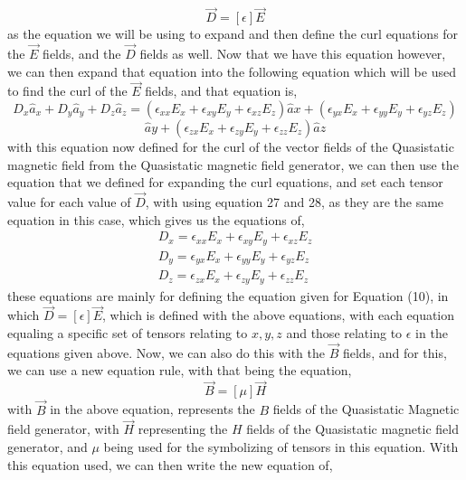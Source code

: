 \documentclass[]{article}
\begin{document}
\begin{equation}
\vec{D} = [\epsilon]\vec{E}
\end{equation}
as the equation we will be using to expand and then define the curl equations for the $\vec{E}$ fields, and the $\vec{D}$ fields as well. Now that we have this equation however, we can then expand that equation into the following equation which will be used to find the curl of the $\vec{E}$ fields, and that equation is,
\begin{equation}
D_x \hat{a}_x + D_y \hat{a}_y + D_z \hat{a}_z = (\epsilon_{xx} E_x + \epsilon_{xy}E_y + \epsilon_{xz}E_z)\hat{a}x+(\epsilon_{yx}E_x + \epsilon_{yy}E_y + \epsilon_{yz}E_z)
\end{equation}
\begin{equation}
\hat{a}y + (\epsilon_{zx}E_x + \epsilon_{zy}E_y + \epsilon_{zz}E_z)\hat{a}z
\end{equation}
\linebreak
with this equation now defined for the curl of the vector fields of the Quasistatic magnetic field from the Quasistatic magnetic field generator, we can then use the equation that we defined for expanding the curl equations, and set each tensor value for each value of $\vec{D}$, with using equation 27 and 28, as they are the same equation in this case, which gives us the equations of,
\begin{equation}
\begin{array}{c}
D_x = \epsilon_{xx} E_x + \epsilon_{xy}E_y + \epsilon_{xz}E_z\\
D_y = \epsilon_{yx} E_x + \epsilon_{yy}E_y + \epsilon_{yz}E_z \\
D_z = \epsilon_{zx} E_x + \epsilon_{zy}E_y + \epsilon_{zz}E_z
\end{array}
\end{equation}
these equations are mainly for defining the equation given for Equation (10), in which $\vec{D} = [\epsilon] \vec{E}$, which is defined with the above equations, with each equation equaling a specific set of tensors relating to $x, y, z$ and those relating to $\epsilon$ in the equations given above. Now, we can also do this with the $\vec{B}$ fields, and for this, we can use a new equation rule, with that being the equation,
\begin{equation}
\vec{B} = [\mu]\vec{H}
\end{equation}
with $\vec{B}$ in the above equation, represents the $B$ fields of the Quasistatic Magnetic field generator, with $\vec{H}$ representing the $H$ fields of the Quasistatic magnetic field generator, and $\mu$ being used for the symbolizing of tensors in this equation. With this equation used, we can then write the new equation of,
\end{document}
